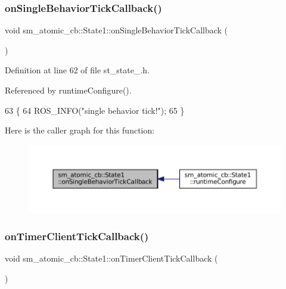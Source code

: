 \subsubsection{\texorpdfstring{on\+Single\+Behavior\+Tick\+Callback()}{onSingleBehaviorTickCallback()}}
{\footnotesize\ttfamily void sm\+\_\+atomic\+\_\+cb\+::\+State1\+::on\+Single\+Behavior\+Tick\+Callback (\begin{DoxyParamCaption}{ }\end{DoxyParamCaption})\hspace{0.3cm}{\ttfamily [inline]}}



Definition at line 62 of file st\+\_\+state\+\_.\+h.



Referenced by runtime\+Configure().


\begin{DoxyCode}
63     \{
64         ROS\_INFO(\textcolor{stringliteral}{"single behavior tick!"});
65     \}
\end{DoxyCode}
Here is the caller graph for this function\+:
\nopagebreak
\begin{figure}[H]
\begin{center}
\leavevmode
\includegraphics[width=350pt]{structsm__atomic__cb_1_1State1_a5c34a516ff618f865f668d7db05b2cb8_icgraph}
\end{center}
\end{figure}
\mbox{\label{structsm__atomic__cb_1_1State1_a1e1f3cc8c74bc13e28ce47f133c2cecb}} 
\subsubsection{\texorpdfstring{on\+Timer\+Client\+Tick\+Callback()}{onTimerClientTickCallback()}}
{\footnotesize\ttfamily void sm\+\_\+atomic\+\_\+cb\+::\+State1\+::on\+Timer\+Client\+Tick\+Callback (\begin{DoxyParamCaption}{ }\end{DoxyParamCaption})\hspace{0.3cm}{\ttfamily [inline]}}



